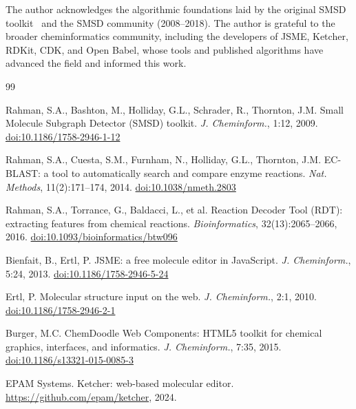 \documentclass[twocolumn]{article}
\begin{document}
The author acknowledges the algorithmic foundations laid by the original
SMSD toolkit~\cite{Rahman2009} and the SMSD community (2008--2018).
The author is grateful to the broader cheminformatics community,
including the developers of JSME, Ketcher, RDKit, CDK, and Open Babel,
whose tools and published algorithms have advanced the field and
informed this work.

\begin{thebibliography}{99}

Rahman, S.A., Bashton, M., Holliday, G.L., Schrader, R., Thornton, J.M.
\newblock Small Molecule Subgraph Detector (SMSD) toolkit.
\newblock \emph{J. Cheminform.}, 1:12, 2009.
\newblock \href{https://doi.org/10.1186/1758-2946-1-12}{doi:10.1186/1758-2946-1-12}

Rahman, S.A., Cuesta, S.M., Furnham, N., Holliday, G.L., Thornton, J.M.
\newblock EC-BLAST: a tool to automatically search and compare enzyme reactions.
\newblock \emph{Nat. Methods}, 11(2):171--174, 2014.
\newblock \href{https://doi.org/10.1038/nmeth.2803}{doi:10.1038/nmeth.2803}

Rahman, S.A., Torrance, G., Baldacci, L., {et al.}
\newblock Reaction Decoder Tool (RDT): extracting features from chemical reactions.
\newblock \emph{Bioinformatics}, 32(13):2065--2066, 2016.
\newblock \href{https://doi.org/10.1093/bioinformatics/btw096}{doi:10.1093/bioinformatics/btw096}

Bienfait, B., Ertl, P.
\newblock JSME: a free molecule editor in JavaScript.
\newblock \emph{J. Cheminform.}, 5:24, 2013.
\newblock \href{https://doi.org/10.1186/1758-2946-5-24}{doi:10.1186/1758-2946-5-24}

Ertl, P.
\newblock Molecular structure input on the web.
\newblock \emph{J. Cheminform.}, 2:1, 2010.
\newblock \href{https://doi.org/10.1186/1758-2946-2-1}{doi:10.1186/1758-2946-2-1}

Burger, M.C.
\newblock ChemDoodle Web Components: HTML5 toolkit for chemical graphics,
  interfaces, and informatics.
\newblock \emph{J. Cheminform.}, 7:35, 2015.
\newblock \href{https://doi.org/10.1186/s13321-015-0085-3}{doi:10.1186/s13321-015-0085-3}

EPAM Systems.
\newblock Ketcher: web-based molecular editor.
\newblock \url{https://github.com/epam/ketcher}, 2024.


\end{thebibliography}
\end{document}
